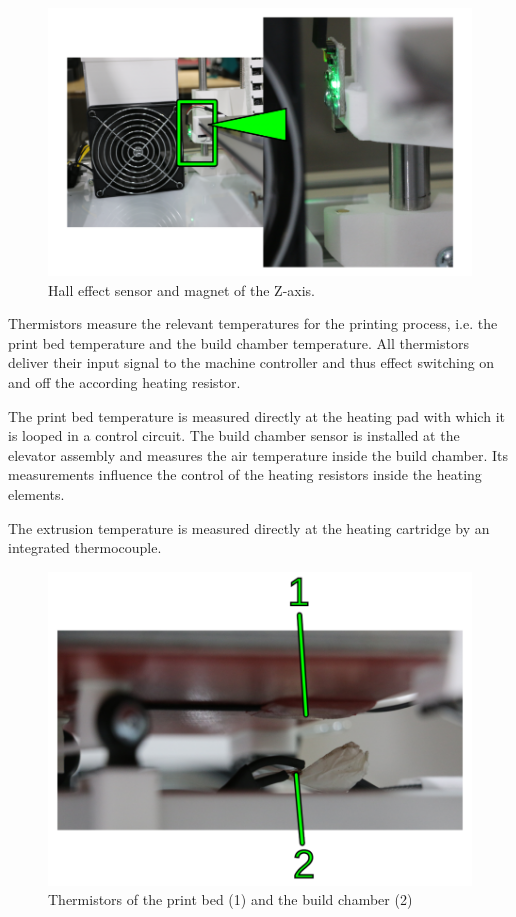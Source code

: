 \begin{figure}[H]
  \centering
  \includegraphics[width=.7\linewidth]{./img/desc_z-sensor.png}
  \caption{Hall effect sensor and magnet of the Z-axis.}
\end{figure}

Thermistors measure the relevant temperatures for the printing process, i.e. the print bed temperature and the build chamber temperature. 
All thermistors deliver their input signal to the machine controller and thus effect switching on and off the according heating resistor.

The print bed temperature is measured directly at the heating pad with which it is looped in a control circuit.
The build chamber sensor is installed at the elevator assembly and measures the air temperature inside the build chamber. Its measurements influence the control of the heating resistors inside the heating elements.

The extrusion temperature is measured directly at the heating cartridge by an integrated thermocouple.

\begin{figure}[H]
  \centering
  \includegraphics[width=.7\linewidth]{./img/desc_thermistors_printbed_chamber.png}
  \caption{Thermistors of the print bed (1) and the build chamber (2)}
\end{figure}

